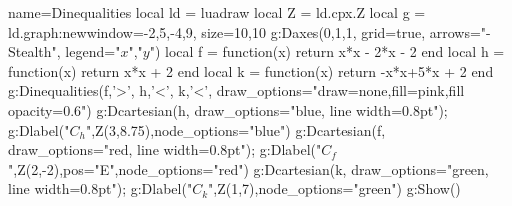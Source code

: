 \begin{luadraw}{name=Dinequalities}
local ld = luadraw
local Z = ld.cpx.Z
local g = ld.graph:new{window={-2,5,-4,9}, size={10,10}}
g:Daxes({0,1,1}, {grid=true, arrows="-Stealth", legend={"$x$","$y$"}})
local f = function(x) return x*x - 2*x - 2 end
local h = function(x) return x*x + 2 end
local k = function(x) return -x*x+5*x + 2 end
g:Dinequalities({f,'>', h,'<', k,'<'}, {draw_options="draw=none,fill=pink,fill opacity=0.6"})
g:Dcartesian(h, {draw_options="blue, line width=0.8pt"}); g:Dlabel("$C_h$",Z(3,8.75),{node_options="blue"})
g:Dcartesian(f, {draw_options="red, line width=0.8pt"}); g:Dlabel("$C_f$",Z(2,-2),{pos="E",node_options="red"})
g:Dcartesian(k, {draw_options="green, line width=0.8pt"}); g:Dlabel("$C_k$",Z(1,7),{node_options="green"})
g:Show()
\end{luadraw}
